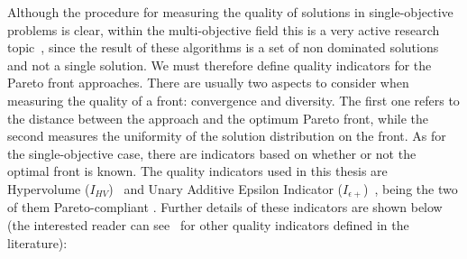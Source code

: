 Although the procedure for measuring the quality of solutions in single-objective problems is clear, within the multi-objective field this is a very active research topic~\cite{knowles06tutorial, zitzler03performance}, since the result of these algorithms is a set of non dominated solutions and not a single solution. We must therefore define quality indicators for the Pareto front approaches. There are usually two aspects to consider when measuring the quality of a front: convergence and diversity. The first one refers to the distance between the approach and the optimum Pareto front, while the second measures the uniformity of the solution distribution on the front. As for the single-objective case, there are indicators based on whether or not the optimal front is known.
The quality indicators used in this thesis are Hypervolume ($I_{HV}$)~\cite{zitzler99multiobjective} and Unary Additive Epsilon Indicator ($I_{\epsilon+}$)~\cite{zitzler03performance}, being the two of them Pareto-compliant \cite{knowles06tutorial}. Further details of these indicators are shown below (the interested reader can see~\cite{coello07evolutionary, deb01multiobjective} for other quality indicators defined in the literature):

